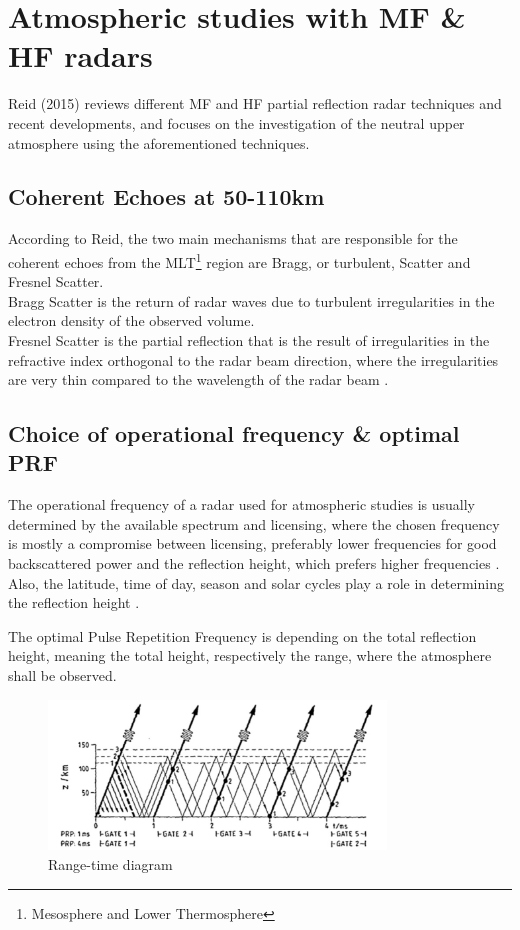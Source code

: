 \section{Atmospheric studies with MF \& HF radars}
Reid (2015) \citep{reid2015mf} reviews different MF and HF partial reflection radar techniques and recent developments, and focuses on the investigation of the neutral upper atmosphere using the aforementioned techniques.


\subsection{Coherent Echoes at 50-110km}
According to Reid, the two main mechanisms that are responsible for the coherent echoes from the MLT\footnote{Mesosphere and Lower Thermosphere} region are Bragg, or turbulent, Scatter and Fresnel Scatter. \\
Bragg Scatter is the return of radar waves due to turbulent irregularities in the electron density of the observed volume. \\
Fresnel Scatter is the partial reflection that is the result of irregularities in the refractive index orthogonal to the radar beam direction, where the irregularities are very thin compared to the wavelength of the radar beam \citep{reid2015mf}.

\subsection{Choice of operational frequency \& optimal PRF}

The operational frequency of a radar used for atmospheric studies is usually determined by the available spectrum and licensing, where the chosen frequency is mostly a compromise between licensing, preferably lower frequencies for good backscattered power and the reflection height, which prefers higher frequencies \citep{reid2015mf}. Also, the latitude, time of day, season and solar cycles play a role in determining the reflection height \citep{jursa1985handbook}.

The optimal Pulse Repetition Frequency is depending on the total reflection height, meaning the total height, respectively the range, where the atmosphere shall be observed.
\begin{figure}[h]
	\centering
	\includegraphics[width=0.8\textwidth]{images/maxPRF}	
	\caption{Range-time diagram \citep[c.f.][Fig. 5]{reid2015mf} }
\end{figure}


